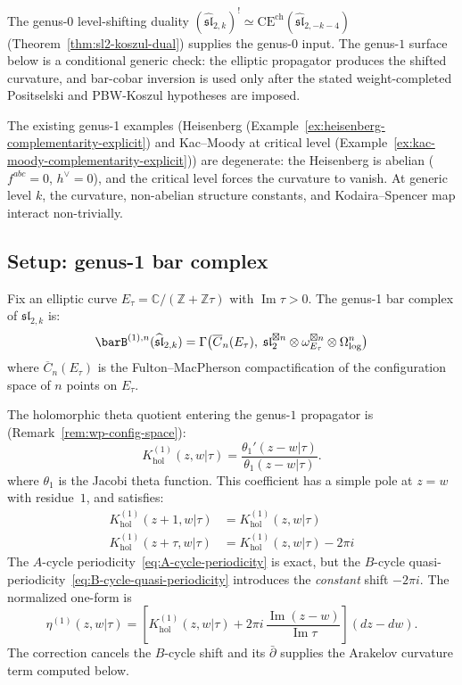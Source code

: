 The genus-0 level-shifting duality
\((\widehat{\mathfrak{sl}}_{2,k})^! \simeq
\mathrm{CE}^{\mathrm{ch}}(\widehat{\mathfrak{sl}}_{2,-k-4})\)
(Theorem~\ref{thm:sl2-koszul-dual}) supplies the genus-$0$ input.  The
genus-$1$ surface below is a conditional generic check: the elliptic
propagator produces the shifted curvature, and bar-cobar inversion is
used only after the stated weight-completed Positselski and
PBW-Koszul hypotheses are imposed.

The existing genus-1 examples (Heisenberg (Example~\ref{ex:heisenberg-complementarity-explicit}) and Kac--Moody at critical level (Example~\ref{ex:kac-moody-complementarity-explicit})) are degenerate: the Heisenberg is abelian ($f^{abc}=0$, $h^\vee=0$), and the critical level forces the curvature to vanish. At generic level $k$, the curvature, non-abelian structure constants, and Kodaira--Spencer map interact non-trivially.

\subsection{Setup: genus-1 bar complex}

Fix an elliptic curve $E_\tau = \mathbb{C}/(\mathbb{Z}+\mathbb{Z}\tau)$ with $\operatorname{Im}\tau>0$. The genus-1 bar complex of $\widehat{\mathfrak{sl}}_{2,k}$ is:
\begin{equation}\label{eq:sl2-genus1-bar}
\barB^{(1),n}(\widehat{\mathfrak{sl}}_{2,k}) = \Gamma\bigl(\overline{C}_n(E_\tau),\; \mathfrak{sl}_2^{\boxtimes n} \otimes \omega_{E_\tau}^{\boxtimes n} \otimes \Omega^n_{\log}\bigr)
\end{equation}
where $\overline{C}_n(E_\tau)$ is the Fulton--MacPherson compactification of the configuration space of $n$ points on $E_\tau$.

The holomorphic theta quotient entering the genus-$1$ propagator is
(Remark~\ref{rem:wp-config-space}):
\begin{equation}\label{eq:genus1-propagator}
K_{\mathrm{hol}}^{(1)}(z,w|\tau)
=
\frac{\theta_1'(z-w|\tau)}{\theta_1(z-w|\tau)} .
\end{equation}
where $\theta_1$ is the Jacobi theta function. This coefficient has a simple pole at $z=w$ with residue~$1$, and satisfies:
\begin{align}
K_{\mathrm{hol}}^{(1)}(z+1,w|\tau) &= K_{\mathrm{hol}}^{(1)}(z,w|\tau) \label{eq:A-cycle-periodicity} \\
K_{\mathrm{hol}}^{(1)}(z+\tau,w|\tau) &= K_{\mathrm{hol}}^{(1)}(z,w|\tau) - 2\pi i \label{eq:B-cycle-quasi-periodicity}
\end{align}
The $A$-cycle periodicity~\eqref{eq:A-cycle-periodicity} is exact, but the $B$-cycle quasi-periodicity~\eqref{eq:B-cycle-quasi-periodicity} introduces the \emph{constant} shift $-2\pi i$. The normalized one-form is
\[
\eta^{(1)}(z,w|\tau)
=
\left[
K_{\mathrm{hol}}^{(1)}(z,w|\tau)
+2\pi i\,\frac{\operatorname{Im}(z-w)}{\operatorname{Im}\tau}
\right](dz-dw).
\]
The correction cancels the $B$-cycle shift and its $\bar\partial$
supplies the Arakelov curvature term computed below.

